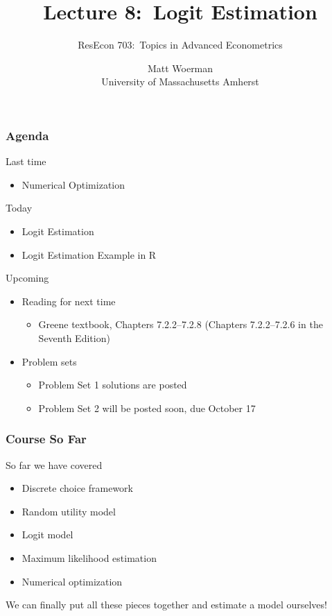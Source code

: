 \documentclass{beamer}\usepackage[]{graphicx}\usepackage[]{color}
\title[Lecture 8:\ Logit Estimation]{Lecture 8:\ Logit Estimation}
\author[ResEcon 703:\ Advanced Econometrics]{ResEcon 703:\ Topics in Advanced Econometrics}
\date{Matt Woerman\\University of Massachusetts Amherst}
\begin{document}
{ 
\begin{frame}[noframenumbering]
    \titlepage
\end{frame}
}

\begin{frame}\frametitle{Agenda}
    Last time
    \begin{itemize}
        \item Numerical Optimization
    \end{itemize}
    \vspace{2ex}
    Today
    \begin{itemize}
    	\item Logit Estimation
    	\item Logit Estimation Example in R
    \end{itemize}
    \vspace{2ex}
    Upcoming
    \begin{itemize}
        \item Reading for next time
        \begin{itemize}
            \item Greene textbook, Chapters 7.2.2--7.2.8 (Chapters 7.2.2--7.2.6 in the Seventh Edition)
        \end{itemize}
        \item Problem sets
        \begin{itemize}
        	\item Problem Set 1 solutions are posted
            \item Problem Set 2 will be posted soon, due October 17
        \end{itemize}
    \end{itemize}
\end{frame}

\begin{frame}\frametitle{Course So Far}
    So far we have covered
    \begin{itemize}
    	\item Discrete choice framework
    	\item Random utility model
    	\item Logit model
    	\item Maximum likelihood estimation
    	\item Numerical optimization
    \end{itemize}
    \vspace{3ex}
    We can finally put all these pieces together and estimate a model ourselves!
\end{frame}
\end{document}
